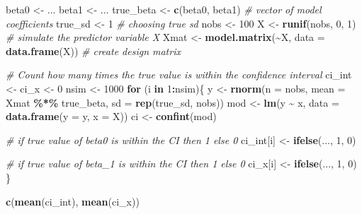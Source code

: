 \documentclass[
]{article}
\newenvironment{Shaded}{\begin{snugshade}}{\end{snugshade}}
\newcommand{\AttributeTok}[1]{\textcolor[rgb]{0.13,0.29,0.53}{#1}}
\newcommand{\CommentTok}[1]{\textcolor[rgb]{0.56,0.35,0.01}{\textit{#1}}}
\newcommand{\ControlFlowTok}[1]{\textcolor[rgb]{0.13,0.29,0.53}{\textbf{#1}}}
\newcommand{\DecValTok}[1]{\textcolor[rgb]{0.00,0.00,0.81}{#1}}
\newcommand{\FunctionTok}[1]{\textcolor[rgb]{0.13,0.29,0.53}{\textbf{#1}}}
\newcommand{\NormalTok}[1]{#1}
\newcommand{\OtherTok}[1]{\textcolor[rgb]{0.56,0.35,0.01}{#1}}
\newcommand{\SpecialCharTok}[1]{\textcolor[rgb]{0.81,0.36,0.00}{\textbf{#1}}}
\begin{document}
\begin{Shaded}
\begin{Highlighting}[]
\NormalTok{beta0 }\OtherTok{\textless{}{-}}\NormalTok{ ...}
\NormalTok{beta1 }\OtherTok{\textless{}{-}}\NormalTok{ ...}
\NormalTok{true\_beta }\OtherTok{\textless{}{-}} \FunctionTok{c}\NormalTok{(beta0, beta1) }\CommentTok{\# vector of model coefficients}
\NormalTok{true\_sd }\OtherTok{\textless{}{-}} \DecValTok{1} \CommentTok{\# choosing true sd}
\NormalTok{nobs }\OtherTok{\textless{}{-}} \DecValTok{100}
\NormalTok{X }\OtherTok{\textless{}{-}} \FunctionTok{runif}\NormalTok{(nobs, }\DecValTok{0}\NormalTok{, }\DecValTok{1}\NormalTok{) }\CommentTok{\# simulate the predictor variable X}
\NormalTok{Xmat }\OtherTok{\textless{}{-}} \FunctionTok{model.matrix}\NormalTok{(}\SpecialCharTok{\textasciitilde{}}\NormalTok{X, }\AttributeTok{data =} \FunctionTok{data.frame}\NormalTok{(X)) }\CommentTok{\# create design matrix}

\CommentTok{\# Count how many times the true value is within the confidence interval}
\NormalTok{ci\_int }\OtherTok{\textless{}{-}}\NormalTok{ ci\_x }\OtherTok{\textless{}{-}} \DecValTok{0}
\NormalTok{nsim }\OtherTok{\textless{}{-}} \DecValTok{1000}
\ControlFlowTok{for}\NormalTok{ (i }\ControlFlowTok{in} \DecValTok{1}\SpecialCharTok{:}\NormalTok{nsim)\{}
\NormalTok{  y }\OtherTok{\textless{}{-}} \FunctionTok{rnorm}\NormalTok{(}\AttributeTok{n =}\NormalTok{ nobs, }\AttributeTok{mean =}\NormalTok{ Xmat }\SpecialCharTok{\%*\%}\NormalTok{ true\_beta, }\AttributeTok{sd =} \FunctionTok{rep}\NormalTok{(true\_sd, nobs))}
\NormalTok{  mod }\OtherTok{\textless{}{-}} \FunctionTok{lm}\NormalTok{(y }\SpecialCharTok{\textasciitilde{}}\NormalTok{ x, }\AttributeTok{data =} \FunctionTok{data.frame}\NormalTok{(}\AttributeTok{y =}\NormalTok{ y, }\AttributeTok{x =}\NormalTok{ X))}
\NormalTok{  ci }\OtherTok{\textless{}{-}} \FunctionTok{confint}\NormalTok{(mod)}

  \CommentTok{\# if true value of beta0 is within the CI then 1 else 0}
\NormalTok{  ci\_int[i] }\OtherTok{\textless{}{-}} \FunctionTok{ifelse}\NormalTok{(..., }\DecValTok{1}\NormalTok{, }\DecValTok{0}\NormalTok{)}

  \CommentTok{\# if true value of beta\_1 is within the CI then 1 else 0}
\NormalTok{  ci\_x[i] }\OtherTok{\textless{}{-}} \FunctionTok{ifelse}\NormalTok{(..., }\DecValTok{1}\NormalTok{, }\DecValTok{0}\NormalTok{)}
\NormalTok{\}}

\FunctionTok{c}\NormalTok{(}\FunctionTok{mean}\NormalTok{(ci\_int), }\FunctionTok{mean}\NormalTok{(ci\_x))}
\end{Highlighting}
\end{Shaded}
\end{document}
